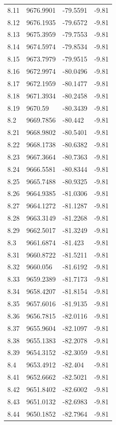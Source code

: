 \begin{table}[H]
\begin{tabular}{llll}
8.11 & 9676.9901 & -79.5591 & -9.81 \\
8.12 & 9676.1935 & -79.6572 & -9.81 \\
8.13 & 9675.3959 & -79.7553 & -9.81 \\
8.14 & 9674.5974 & -79.8534 & -9.81 \\
8.15 & 9673.7979 & -79.9515 & -9.81 \\
8.16 & 9672.9974 & -80.0496 & -9.81 \\
8.17 & 9672.1959 & -80.1477 & -9.81 \\
8.18 & 9671.3934 & -80.2458 & -9.81 \\
8.19 & 9670.59 & -80.3439 & -9.81 \\
8.2 & 9669.7856 & -80.442 & -9.81 \\
8.21 & 9668.9802 & -80.5401 & -9.81 \\
8.22 & 9668.1738 & -80.6382 & -9.81 \\
8.23 & 9667.3664 & -80.7363 & -9.81 \\
8.24 & 9666.5581 & -80.8344 & -9.81 \\
8.25 & 9665.7488 & -80.9325 & -9.81 \\
8.26 & 9664.9385 & -81.0306 & -9.81 \\
8.27 & 9664.1272 & -81.1287 & -9.81 \\
8.28 & 9663.3149 & -81.2268 & -9.81 \\
8.29 & 9662.5017 & -81.3249 & -9.81 \\
8.3 & 9661.6874 & -81.423 & -9.81 \\
8.31 & 9660.8722 & -81.5211 & -9.81 \\
8.32 & 9660.056 & -81.6192 & -9.81 \\
8.33 & 9659.2389 & -81.7173 & -9.81 \\
8.34 & 9658.4207 & -81.8154 & -9.81 \\
8.35 & 9657.6016 & -81.9135 & -9.81 \\
8.36 & 9656.7815 & -82.0116 & -9.81 \\
8.37 & 9655.9604 & -82.1097 & -9.81 \\
8.38 & 9655.1383 & -82.2078 & -9.81 \\
8.39 & 9654.3152 & -82.3059 & -9.81 \\
8.4 & 9653.4912 & -82.404 & -9.81 \\
8.41 & 9652.6662 & -82.5021 & -9.81 \\
8.42 & 9651.8402 & -82.6002 & -9.81 \\
8.43 & 9651.0132 & -82.6983 & -9.81 \\
8.44 & 9650.1852 & -82.7964 & -9.81 \\

\end{tabular}
\end{table}
